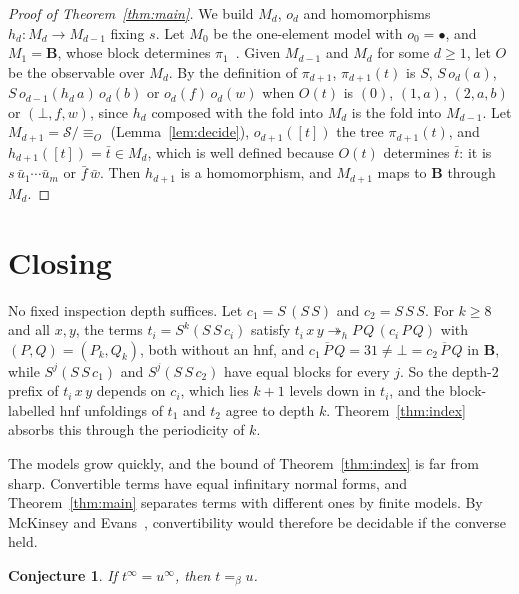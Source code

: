 \documentclass[11pt]{amsart}
\newtheorem{conjecture}[theorem]{Conjecture}
\theoremstyle{definition}
\newcommand{\Ter}{\mathcal S}
\newcommand{\hole}{\bullet}
\newcommand{\B}{\mathbf B}
\newcommand{\hred}{\twoheadrightarrow_h}
\newcommand{\conv}{=_\beta}
\begin{document}
\begin{proof}[Proof of Theorem~\ref{thm:main}]
We build $M_d$, $o_d$ and homomorphisms $h_d\colon M_d\to M_{d-1}$ fixing $s$. Let $M_0$ be the
one-element model with $o_0=\hole$, and $M_1=\B$, whose block determines $\pi_1$~\citep{s1}. Given
$M_{d-1}$ and $M_d$ for some $d\ge1$, let $O$ be the observable over $M_d$. By the definition of
$\pi_{d+1}$, $\pi_{d+1}(t)$ is $S$, $S\,o_d(a)$, $S\,o_{d-1}(h_d\,a)\,o_d(b)$ or $o_d(f)\,o_d(w)$ when
$O(t)$ is $(0)$, $(1,a)$, $(2,a,b)$ or $(\bot,f,w)$, since $h_d$ composed with the fold into $M_d$ is
the fold into $M_{d-1}$. Let $M_{d+1}=\Ter/{\equiv_O}$ (Lemma~\ref{lem:decide}), $o_{d+1}([t])$ the tree $\pi_{d+1}(t)$, and $h_{d+1}([t])=\bar t\in M_d$, which is well defined because $O(t)$ determines $\bar t$: it is
$s\,\bar u_1\cdots\bar u_m$ or $\bar f\,\bar w$. Then $h_{d+1}$ is a homomorphism, and $M_{d+1}$ maps to
$\B$ through $M_d$.
\end{proof}

\section{Closing}\label{sec:close}

No fixed inspection depth suffices. Let $c_1=S\,(S\,S)$ and $c_2=S\,S\,S$. For $k\ge8$ and all $x,y$,
the terms $t_i=S^k(S\,S\,c_i)$ satisfy $t_i\,x\,y\hred P\,Q\,(c_i\,P\,Q)$ with $(P,Q)=(P_k,Q_k)$, both without an hnf,
and $\overline{c_1\,P\,Q}=31\ne\bot=\overline{c_2\,P\,Q}$ in $\B$, while $S^j(S\,S\,c_1)$ and
$S^j(S\,S\,c_2)$ have equal blocks for every $j$. So the depth-$2$ prefix of $t_i\,x\,y$ depends on $c_i$,
which lies $k+1$ levels down in $t_i$, and the block-labelled hnf unfoldings of $t_1$ and $t_2$ agree to depth $k$. Theorem~\ref{thm:index} absorbs this through the periodicity of $k$.

The models grow quickly, and the bound of
Theorem~\ref{thm:index} is far from sharp. Convertible terms have equal infinitary normal forms, and
Theorem~\ref{thm:main} separates terms with different ones by finite models. By McKinsey and
Evans~\citep{mckinsey,evans}, convertibility would therefore be decidable if the converse held.

\begin{conjecture}
If $t^\infty=u^\infty$, then $t\conv u$.
\end{conjecture}
\end{document}
